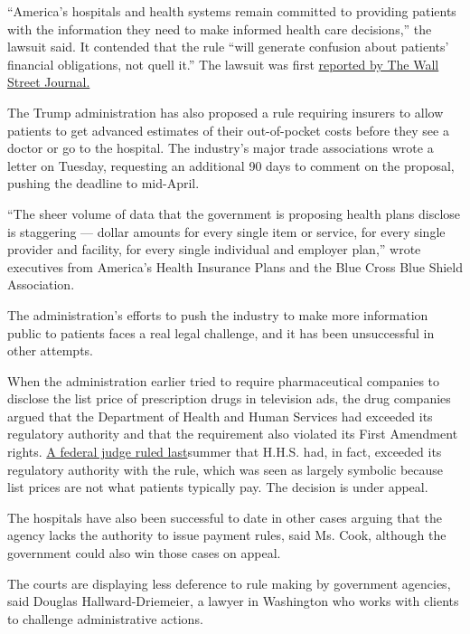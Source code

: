 ``America's hospitals and health systems remain committed to providing
patients with the information they need to make informed health care
decisions,'' the lawsuit said. It contended that the rule ``will
generate confusion about patients' financial obligations, not quell
it.'' The lawsuit was first
\href{https://www.wsj.com/articles/hospital-groups-sue-to-block-price-transparency-rule-11575460685}{reported
by The Wall Street Journal.}

The Trump administration has also proposed a rule requiring insurers to
allow patients to get advanced estimates of their out-of-pocket costs
before they see a doctor or go to the hospital. The industry's major
trade associations wrote a letter on Tuesday, requesting an additional
90 days to comment on the proposal, pushing the deadline to mid-April.

``The sheer volume of data that the government is proposing health plans
disclose is staggering --- dollar amounts for every single item or
service, for every single provider and facility, for every single
individual and employer plan,'' wrote executives from America's Health
Insurance Plans and the Blue Cross Blue Shield Association.

The administration's efforts to push the industry to make more
information public to patients faces a real legal challenge, and it has
been unsuccessful in other attempts.

When the administration earlier tried to require pharmaceutical
companies to disclose the list price of prescription drugs in television
ads, the drug companies argued that the Department of Health and Human
Services had exceeded its regulatory authority and that the requirement
also violated its First Amendment rights.
\href{https://www.nytimes3xbfgragh.onion/2019/07/08/health/drug-prices-tv-ads-trump.html?rref=collection\%2Fbyline\%2Fkatie-thomas\&action=click\&contentCollection=undefined\&region=stream\&module=inline\&version=latest\&contentPlacement=6\&pgtype=collection}{A
federal judge ruled last}summer that H.H.S. had, in fact, exceeded its
regulatory authority with the rule, which was seen as largely symbolic
because list prices are not what patients typically pay. The decision is
under appeal.

The hospitals have also been successful to date in other cases arguing
that the agency lacks the authority to issue payment rules, said Ms.
Cook, although the government could also win those cases on appeal.

The courts are displaying less deference to rule making by government
agencies, said Douglas Hallward-Driemeier, a lawyer in Washington who
works with clients to challenge administrative actions.

